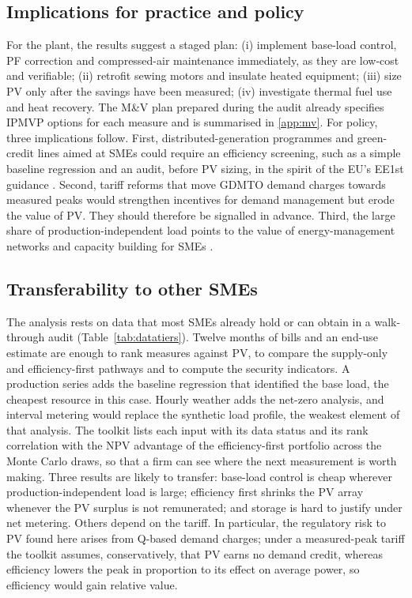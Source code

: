 \documentclass[preprint,12pt,authoryear]{elsarticle}
\begin{document}
\subsection{Implications for practice and policy}
For the plant, the results suggest a staged plan: (i) implement base-load control, PF correction and compressed-air maintenance immediately, as they are low-cost and verifiable; (ii) retrofit sewing motors and insulate heated equipment; (iii) size PV only after the savings have been measured; (iv) investigate thermal fuel use and heat recovery. The M\&V plan prepared during the audit already specifies IPMVP options for each measure \citep{evo2022ipmvp} and is summarised in \ref{app:mv}. For policy, three implications follow. First, distributed-generation programmes and green-credit lines aimed at SMEs could require an efficiency screening, such as a simple baseline regression and an audit, before PV sizing, in the spirit of the EU's EE1st guidance \citep{ec2024ee1st}. Second, tariff reforms that move GDMTO demand charges towards measured peaks would strengthen incentives for demand management but erode the value of PV. They should therefore be signalled in advance. Third, the large share of production-independent load points to the value of energy-management networks and capacity building for SMEs \citep{jalo2021,johansson2019,herce2024}.

\subsection{Transferability to other SMEs}
The analysis rests on data that most SMEs already hold or can obtain in a walk-through audit (Table~\ref{tab:datatiers}). Twelve months of bills and an end-use estimate are enough to rank measures against PV, to compare the supply-only and efficiency-first pathways and to compute the security indicators. A production series adds the baseline regression that identified the base load, the cheapest resource in this case. Hourly weather adds the net-zero analysis, and interval metering would replace the synthetic load profile, the weakest element of that analysis. The toolkit lists each input with its data status and its rank correlation with the NPV advantage of the efficiency-first portfolio across the Monte Carlo draws, so that a firm can see where the next measurement is worth making. Three results are likely to transfer: base-load control is cheap wherever production-independent load is large; efficiency first shrinks the PV array whenever the PV surplus is not remunerated; and storage is hard to justify under net metering. Others depend on the tariff. In particular, the regulatory risk to PV found here arises from Q-based demand charges; under a measured-peak tariff the toolkit assumes, conservatively, that PV earns no demand credit, whereas efficiency lowers the peak in proportion to its effect on average power, so efficiency would gain relative value.
\end{document}
